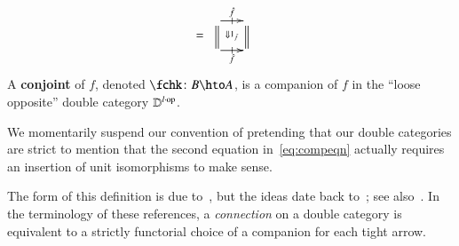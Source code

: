 \begin{defn}
\begin{align}
\begin{array}{c}
    \end{array} &=
    \begin{array}{c}
      \xymatrix@-.5pc{
        \ar[r]|-@{|}^-{\fhat} \ar@{=}[d] \ar@{}[dr]|{\Downarrow 1_{\fhat}}
        & \ar@{=}[d]\\
        \ar[r]|-@{|}_-{\fhat} & }
    \end{array}
  \end{align}
  A \textbf{conjoint} of $f$, denoted $\fchk\maps B\hto A$, is a
  companion of $f$ in the ``loose opposite'' double category $\mathbb{D}^{l\cdot\mathrm{op}}$.
\end{defn}

\begin{rmk}
  We momentarily suspend our convention of pretending that our double
  categories are strict to mention that the second
  equation in~\eqref{eq:compeqn} actually requires an insertion of unit
  isomorphisms to make sense.
\end{rmk}

The form of this definition is due
to~\cite{gp:double-adjoints,dpp:spans}, but the ideas date back
to~\cite{bs:dblgpd-xedmod}; see
also~\cite{bm:dbl-thin-conn,fiore:pscat}.  In the terminology of these
references, a \emph{connection} on a double category is equivalent to
a strictly functorial choice of a companion for each tight arrow.


